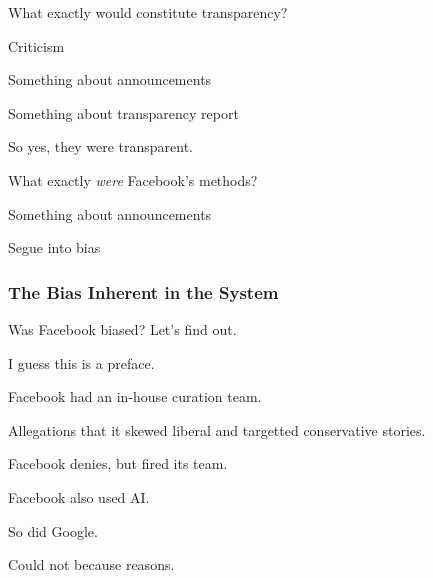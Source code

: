 
\par What exactly would constitute transparency?

\par Criticism

\par Something about announcements \cite{fb_hoaxes_2015}

\par Something about transparency report \cite{fb_info_ops}

\par So yes, they were transparent.


\par What exactly \emph{were} Facebook's methods?

\par Something about announcements

\par Segue into bias

\subsubsection{The Bias Inherent in the System}

\par Was Facebook biased? Let's find out.


\par I guess this is a preface.


\par Facebook had an in-house curation team.
\par Allegations that it skewed liberal and targetted conservative stories.
\par Facebook denies, but fired its team. \cite{tc_ai}


\par Facebook also used AI. \cite{tc_ai}

\par So did Google.

\par Could not because reasons. \cite{ai_cannot_win}


